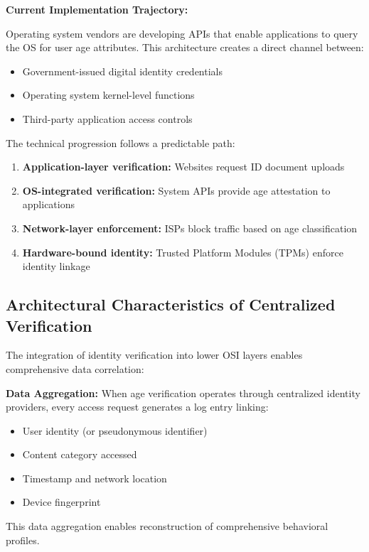 \documentclass[11pt,a4paper]{article}
\begin{document}
\textbf{Current Implementation Trajectory:}

Operating system vendors are developing APIs that enable applications to query the OS for user age attributes. This architecture creates a direct channel between:
\begin{itemize}[leftmargin=*]
    \item Government-issued digital identity credentials
    \item Operating system kernel-level functions
    \item Third-party application access controls
\end{itemize}

The technical progression follows a predictable path:

\begin{enumerate}
    \item \textbf{Application-layer verification:} Websites request ID document uploads
    \item \textbf{OS-integrated verification:} System APIs provide age attestation to applications
    \item \textbf{Network-layer enforcement:} ISPs block traffic based on age classification
    \item \textbf{Hardware-bound identity:} Trusted Platform Modules (TPMs) enforce identity linkage
\end{enumerate}

\subsection{Architectural Characteristics of Centralized Verification}

The integration of identity verification into lower OSI layers enables comprehensive data correlation:

\textbf{Data Aggregation:}
When age verification operates through centralized identity providers, every access request generates a log entry linking:
\begin{itemize}[leftmargin=*]
    \item User identity (or pseudonymous identifier)
    \item Content category accessed
    \item Timestamp and network location
    \item Device fingerprint
\end{itemize}

This data aggregation enables reconstruction of comprehensive behavioral profiles.
\end{document}
